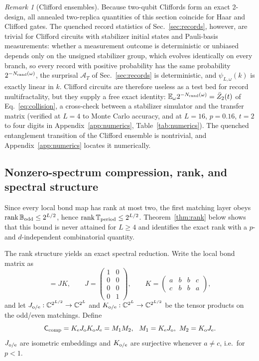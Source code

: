 \documentclass[aps,prx,reprint,superscriptaddress,nobibnotes,longbibliography]{revtex4-2}
\theoremstyle{remark}
\newtheorem{remark}{Remark}
\newcommand{\E}{\mathbb E}
\newcommand{\rk}{\operatorname{rank}}
\newcommand{\Ccomp}{\mathsf C_{\rm comp}}
\newcommand{\Tper}{\mathbb T_{\rm period}}
\begin{document}
\begin{remark}[Clifford ensembles]
\label{rem:clifford}
Because two-qubit Cliffords form an exact 2-design, all annealed two-replica quantities of this section coincide for Haar and Clifford gates.  The quenched record statistics of Sec.~\ref{sec:records}, however, are trivial for Clifford circuits with stabilizer initial states and Pauli-basis measurements: whether a measurement outcome is deterministic or unbiased depends only on the unsigned stabilizer group, which evolves identically on every branch, so every record with positive probability has the same probability $2^{-N_{\rm rand}(\omega)}$, the surprisal $\mathcal A_T$ of Sec.~\ref{sec:records} is deterministic, and $\psi_{L,\omega}(k)$ is exactly linear in $k$.  Clifford circuits are therefore useless as a test bed for record multifractality, but they supply a free exact identity: $\E_\omega2^{-N_{\rm rand}(\omega)}=\bar Z_2(t)$ of Eq.~\eqref{eq:collision}, a cross-check between a stabilizer simulator and the transfer matrix (verified at $L=4$ to Monte Carlo accuracy, and at $L=16$, $p=0.16$, $t=2$ to four digits in Appendix~\ref{app:numerics}, Table~\ref{tab:numerics}).  The quenched entanglement transition of the Clifford ensemble is nontrivial, and Appendix~\ref{app:numerics} locates it numerically.
\end{remark}

\subsection{Nonzero-spectrum compression, rank, and spectral structure}
\label{sec:compression}

Since every local bond map has rank at most two, the first matching layer obeys $\rk\mathbb B_{\rm odd}\le2^{L/2}$, hence $\rk\Tper\le2^{L/2}$.  Theorem~\ref{thm:rank} below shows that this bound is never attained for $L\ge4$ and identifies the exact rank with a $p$- and $d$-independent combinatorial quantity.

The rank structure yields an exact spectral reduction.  Write the local bond matrix as
\begin{equation}
 [\mathcal B_p]=JK,\qquad
 J=\begin{pmatrix}1&0\\0&0\\0&0\\0&1\end{pmatrix},\qquad
 K=\begin{pmatrix}a&b&b&c\\c&b&b&a\end{pmatrix},
 \label{eq:JKfactor}
\end{equation}
and let $J_{\rm o/e}:\mathbb C^{2^{L/2}}\to\mathbb C^{2^L}$ and
$K_{\rm o/e}:\mathbb C^{2^L}\to\mathbb C^{2^{L/2}}$ be the tensor products on the odd/even matchings.  Define
\begin{equation}
 \Ccomp=K_{\rm e}J_{\rm o}K_{\rm o}J_{\rm e}=M_1M_2,\ \ M_1=K_{\rm e}J_{\rm o},\ M_2=K_{\rm o}J_{\rm e}.
 \label{eq:compressed}
\end{equation}
$J_{\rm o/e}$ are isometric embeddings and $K_{\rm o/e}$ are surjective whenever $a\ne c$, i.e.\ for $p<1$.
\end{document}
